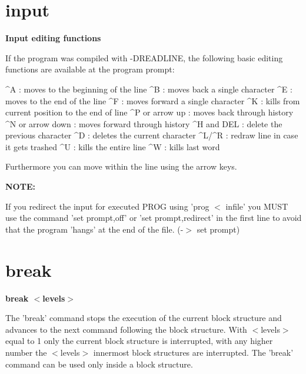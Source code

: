 \section{input}
{\bf Input editing functions \par }
\par
\vspace{3pt}
If the program was compiled with -DREADLINE, the following basic 
editing functions are available at the program prompt: 
\par
\begin{MacVerbatim}
  ^A               : moves to the beginning of the line
  ^B               : moves back a single character
  ^E               : moves to the end of the line
  ^F               : moves forward a single character
  ^K               : kills from current position to the end of line
  ^P or arrow up   : moves back through history
  ^N or arrow down : moves forward through history
  ^H and DEL       : delete the previous character
  ^D               : deletes the current character
  ^L/^R            : redraw line in case it gets trashed
  ^U               : kills the entire line
  ^W               : kills last word
\end{MacVerbatim}
Furthermore you can move within the line using the arrow keys. 
\par
{\bf NOTE: \par }
\par
\vspace{3pt}
If you redirect the input for executed PROG using 'prog $ <$ infile' you 
MUST use the command 'set prompt,off' or 'set prompt,redirect' in 
the first line to avoid that the program 'hangs' at the end of the 
file. (-$> $ set prompt) 
\section{break}
{\bf break $ <$levels$> $ \par }
\par
\vspace{3pt}
The 'break' command stops the execution of the current block structure 
and advances to the next command following the block structure. 
With $ <$levels$> $ equal to 1 only the current block structure is interrupted, 
with any higher number the $ <$levels$> $ innermost block structures are 
interrupted. The 'break' command can be used only inside a block structure. 
